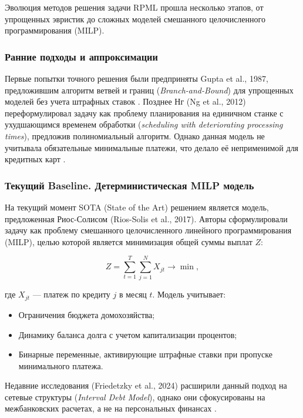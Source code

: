 \documentclass[12pt, a4paper]{report}
\begin{document}
Эволюция методов решения задачи RPML прошла несколько этапов, от упрощенных эвристик до сложных моделей смешанного целочисленного программирования (MILP).

\subsubsection{Ранние подходы и аппроксимации}
Первые попытки точного решения были предприняты Gupta et al., 1987, предложившим алгоритм ветвей и границ (\textit{Branch-and-Bound}) для упрощенных моделей без учета штрафных ставок \cite{gupta1987}. Позднее Нг (Ng et al., 2012) переформулировал задачу как проблему планирования на единичном станке с ухудшающимся временем обработки (\textit{scheduling with deteriorating processing times}), предложив полиномиальный алгоритм. Однако данная модель не учитывала обязательные минимальные платежи, что делало её неприменимой для кредитных карт \cite{ng2012}.

\subsubsection{Текущий Baseline. Детерминистическая MILP модель}
На текущий момент SOTA (State of the Art) решением является модель, предложенная Риос-Солисом (Rios-Solis et al., 2017). Авторы сформулировали задачу как проблему смешанного целочисленного линейного программирования (MILP), целью которой является минимизация общей суммы выплат $Z$:

\begin{equation}
    Z = \sum_{t=1}^T \sum_{j=1}^N X_{jt} \rightarrow \min,
    \label{eq:objective}
\end{equation}

где $X_{jt}$ — платеж по кредиту $j$ в месяц $t$. Модель учитывает:
\begin{itemize}
    \item Ограничения бюджета домохозяйства;
    \item Динамику баланса долга с учетом капитализации процентов;
    \item Бинарные переменные, активирующие штрафные ставки при пропуске минимального платежа.
\end{itemize}

Недавние исследования (Friedetzky et al., 2024) расширили данный подход на сетевые структуры (\textit{Interval Debt Model}), однако они сфокусированы на межбанковских расчетах, а не на персональных финансах \cite{friedetzky2024}.
\end{document}
